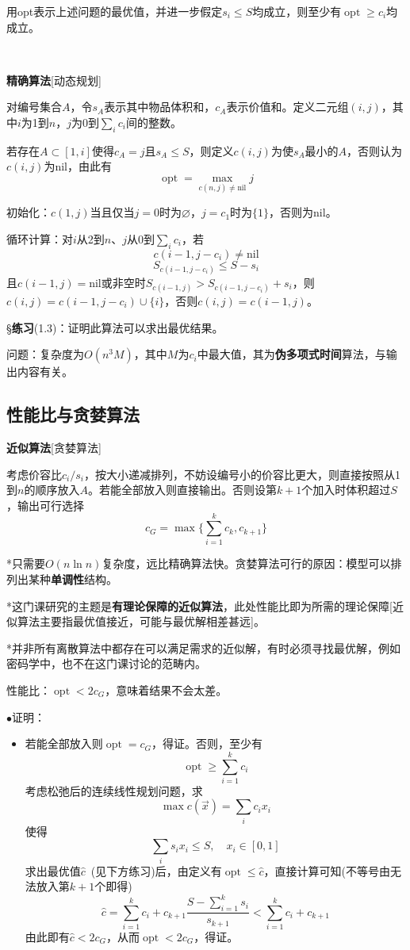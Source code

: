 \documentclass[a4paper,UTF8,fontset=windows]{ctexart}
\newcommand{\exce}[2]{\S\textbf{练习}(#1)：{\kaishu #2}}
\newcommand{\proo}[1]{{\kaishu $\bullet$证明：
\begin{itemize}
    \item[] #1
\end{itemize}
}}
\DeclareMathOperator*{\opt}{opt}
\begin{document}
用opt表示上述问题的最优值，并进一步假定$s_i\le S$均成立，则至少有$\opt\ge c_i$均成立。

\

\textbf{精确算法}[动态规划]

对编号集合$A$，令$s_A$表示其中物品体积和，$c_A$表示价值和。定义二元组$(i,j)$，其中$i$为1到$n$，$j$为0到$\sum_ic_i$间的整数。

若存在$A\subset[1,i]$使得$c_A=j$且$s_A\le S$，则定义$c(i,j)$为使$s_A$最小的$A$，否则认为$c(i,j)$为nil，由此有
$$\opt=\max_{c(n,j)\ne\text{nil}}j$$

初始化：$c(1,j)$当且仅当$j=0$时为$\varnothing$，$j=c_1$时为$\{1\}$，否则为nil。

循环计算：对$i$从2到$n$、$j$从0到$\sum_ic_i$，若
$$c(i-1,j-c_i)\ne\text{nil}$$
$$S_{c(i-1,j-c_i)}\le S-s_i$$
且$c(i-1,j)=\text{nil}$或非空时$S_{c(i-1,j)}>S_{c(i-1,j-c_i)}+s_i$，则$c(i,j)=c(i-1,j-c_i)\cup\{i\}$，否则$c(i,j)=c(i-1,j)$。

\exce{1.3}{证明此算法可以求出最优结果。}

问题：复杂度为$O(n^3M)$，其中$M$为$c_i$中最大值，其为\textbf{伪多项式时间}算法，与输出内容有关。

\subsection{性能比与贪婪算法}
\textbf{近似算法}[贪婪算法]

考虑价容比$c_i/s_i$，按大小递减排列，不妨设编号小的价容比更大，则直接按照从1到$n$的顺序放入$A$。若能全部放入则直接输出。否则设第$k+1$个加入时体积超过$S$，输出可行选择
$$c_G=\max\bigg\{\sum_{i=1}^kc_k,c_{k+1}\bigg\}$$

*只需要$O(n\ln n)$复杂度，远比精确算法快。贪婪算法可行的原因：模型可以排列出某种\textbf{单调性}结构。

*这门课研究的主题是\textbf{有理论保障的近似算法}，此处性能比即为所需的理论保障[近似算法主要指最优值接近，可能与最优解相差甚远]。

*并非所有离散算法中都存在可以满足需求的近似解，有时必须寻找最优解，例如密码学中，也不在这门课讨论的范畴内。

性能比：$\opt<2c_G$，意味着结果不会太差。

\proo{
    若能全部放入则$\opt=c_G$，得证。否则，至少有
    $$\opt\ge\sum_{i=1}^kc_i$$
    考虑松弛后的连续线性规划问题，求
    $$\max c(\vec{x})=\sum_ic_ix_i$$
    使得
    $$\sum_is_ix_i\le S,\quad x_i\in[0,1]$$
    求出最优值$\hat{c}$\ (见下方练习)后，由定义有$\opt\le\hat{c}$，直接计算可知(不等号由无法放入第$k+1$个即得)
    $$\hat{c}=\sum_{i=1}^kc_i+c_{k+1}\frac{S-\sum_{i=1}^ks_i}{s_{k+1}}<\sum_{i=1}^kc_i+c_{k+1}$$
    由此即有$\hat{c}<2c_G$，从而$\opt<2c_G$，得证。
}
\end{document}
